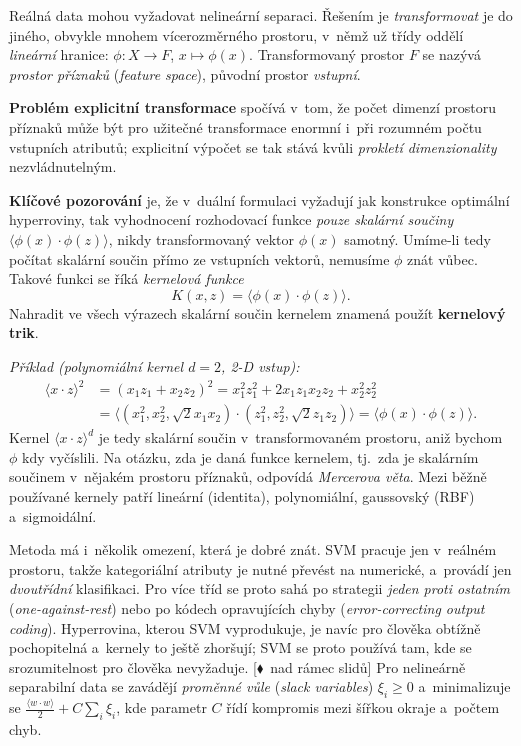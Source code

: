 \documentclass[11pt,a4paper]{article}
\theoremstyle{definition}
\newcommand{\mimo}{\textcolor{markcol}{\textsf{\footnotesize[$\blacklozenge$~nad rámec slidů]}}}
\begin{document}
\begin{defbox}
Reálná data mohou vyžadovat nelineární separaci. Řešením je \emph{transformovat} je do jiného,
obvykle mnohem vícerozměrného prostoru, v~němž už třídy oddělí \emph{lineární} hranice:
$\phi:X\to F$, $x\mapsto\phi(x)$. Transformovaný prostor $F$ se nazývá \emph{prostor
příznaků} (\emph{feature space}), původní prostor \emph{vstupní}.

\textbf{Problém explicitní transformace} spočívá v~tom, že počet dimenzí prostoru příznaků
může být pro užitečné transformace enormní i~při rozumném počtu vstupních atributů; explicitní
výpočet se tak stává kvůli \emph{prokletí dimenzionality} nezvládnutelným.

\textbf{Klíčové pozorování} je, že v~duální formulaci vyžadují jak konstrukce optimální
hyperroviny, tak vyhodnocení rozhodovací funkce \emph{pouze skalární součiny}
$\langle\phi(x)\cdot\phi(z)\rangle$, nikdy transformovaný vektor $\phi(x)$ samotný. Umíme-li
tedy počítat skalární součin přímo ze vstupních vektorů, nemusíme $\phi$ znát vůbec. Takové
funkci se říká \emph{kernelová funkce}
\[ K(x,z)=\langle\phi(x)\cdot\phi(z)\rangle. \]
Nahradit ve všech výrazech skalární součin kernelem znamená použít \textbf{kernelový trik}.

\emph{Příklad (polynomiální kernel $d=2$, 2-D vstup):}
\begin{align*}
\langle x\cdot z\rangle^2&=(x_1z_1+x_2z_2)^2=x_1^2z_1^2+2x_1z_1x_2z_2+x_2^2z_2^2\\
&=\big\langle (x_1^2,x_2^2,\sqrt2 x_1x_2)\cdot(z_1^2,z_2^2,\sqrt2 z_1z_2)\big\rangle
 =\langle\phi(x)\cdot\phi(z)\rangle.
\end{align*}
Kernel $\langle x\cdot z\rangle^d$ je tedy skalární součin v~transformovaném prostoru, aniž
bychom $\phi$ kdy vyčíslili. Na otázku, zda je daná funkce kernelem, tj.\ zda je skalárním
součinem v~nějakém prostoru příznaků, odpovídá \emph{Mercerova věta}. Mezi běžně používané
kernely patří lineární (identita), polynomiální, gaussovský (RBF) a~sigmoidální.
\end{defbox}

Metoda má i~několik omezení, která je dobré znát. SVM pracuje jen v~reálném prostoru, takže
kategoriální atributy je nutné převést na numerické, a~provádí jen \emph{dvoutřídní}
klasifikaci. Pro více tříd se proto sahá po strategii \emph{jeden proti ostatním}
(\emph{one-against-rest}) nebo po kódech opravujících chyby (\emph{error-correcting output
coding}). Hyperrovina, kterou SVM vyprodukuje, je navíc pro člověka obtížně pochopitelná
a~kernely to ještě zhoršují; SVM se proto používá tam, kde se srozumitelnost pro člověka
nevyžaduje. \mimo{} Pro nelineárně separabilní data se zavádějí \emph{proměnné vůle}
(\emph{slack variables}) $\xi_i\ge 0$ a~minimalizuje se
$\frac{\langle w\cdot w\rangle}{2}+C\sum_i\xi_i$, kde parametr $C$ řídí kompromis mezi šířkou
okraje a~počtem chyb.
\end{document}
